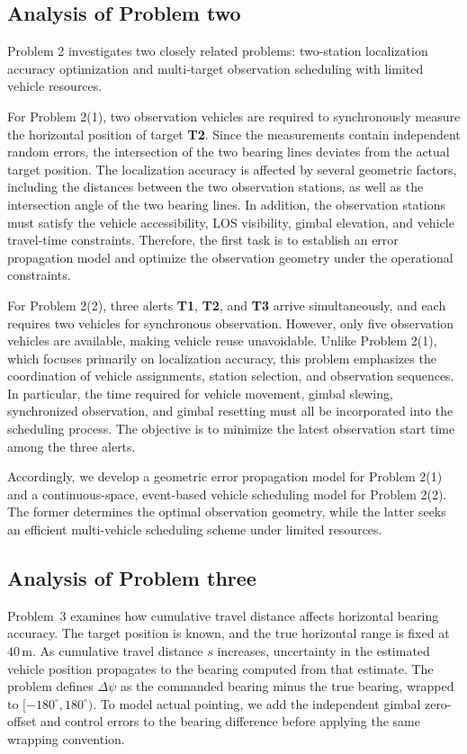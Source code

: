\documentclass{swmcmthesis}
\begin{document}
\subsection{Analysis of Problem two}
Problem 2 investigates two closely related problems: two-station localization accuracy optimization and multi-target observation scheduling with limited vehicle resources.

For Problem 2(1), two observation vehicles are required to synchronously measure the horizontal position of target \textbf{T2}. Since the measurements contain independent random errors, the intersection of the two bearing lines deviates from the actual target position. The localization accuracy is affected by several geometric factors, including the distances between the two observation stations, as well as the intersection angle of the two bearing lines. In addition, the observation stations must satisfy the vehicle accessibility, LOS visibility, gimbal elevation, and vehicle travel-time constraints. Therefore, the first task is to establish an error propagation model and optimize the observation geometry under the operational constraints.

For Problem 2(2), three alerts \textbf{T1}, \textbf{T2}, and \textbf{T3} arrive simultaneously, and each requires two vehicles for synchronous observation. However, only five observation vehicles are available, making vehicle reuse unavoidable. Unlike Problem 2(1), which focuses primarily on localization accuracy, this problem emphasizes the coordination of vehicle assignments, station selection, and observation sequences. In particular, the time required for vehicle movement, gimbal slewing, synchronized observation, and gimbal resetting must all be incorporated into the scheduling process. The objective is to minimize the latest observation start time among the three alerts.

Accordingly, we develop a geometric error propagation model for Problem 2(1) and a continuous-space, event-based vehicle scheduling model for Problem 2(2). The former determines the optimal observation geometry, while the latter seeks an efficient multi-vehicle scheduling scheme under limited resources.

\subsection{Analysis of Problem three}

Problem~3 examines how cumulative travel distance affects horizontal bearing accuracy. The target position is known, and the true horizontal range is fixed at \(40\,\mathrm{m}\). As cumulative travel distance \(s\) increases, uncertainty in the estimated vehicle position propagates to the bearing computed from that estimate. The problem defines \(\Delta\psi\) as the commanded bearing minus the true bearing, wrapped to \([-180^\circ,180^\circ)\). To model actual pointing, we add the independent gimbal zero-offset and control errors to the bearing difference before applying the same wrapping convention.
\end{document}
